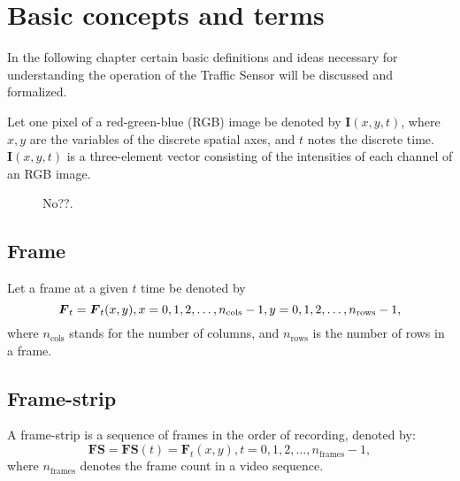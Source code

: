 \chapter{Basic concepts and terms}\label{chap:Concepts}
In the following chapter certain basic definitions and ideas necessary for understanding the operation of the Traffic Sensor will be discussed and formalized.

Let one pixel of a red-green-blue (RGB) image be denoted by $\boldsymbol{I}(x,y,t)$, where $x, y$ are the variables of the discrete spatial axes, and $t$ notes the discrete time.
$\boldsymbol{I}(x,y,t)$ is a three-element vector consisting of the intensities of each channel of an RGB image.

\begin{figure}[h!]
	\centering
	\scalebox{.7}{}
	\label{fig:notations}
	\caption{No??.}
\end{figure}

\section{Frame}
Let a frame at a given $t$ time be denoted by
\begin{displaymath}
	\boldsymbol{F}_t=\boldsymbol{F}_t(x,y),\\
	x=0,1,2,\dotsc,n_{\text{cols}}-1,\\
	y=0,1,2,\dotsc,n_{\text{rows}}-1,
\end{displaymath}
where $n_{\text{cols}}$ stands for the number of columns, and $n_{\text{rows}}$ is the number of rows in a frame. 

\section{Frame-strip}
A frame-strip is a sequence of frames in the order of recording, denoted by:
\begin{displaymath}
	\boldsymbol{FS}=\boldsymbol{FS}(t)=\boldsymbol{F}_t(x,y),
	t=0,1,2,\dotsc,n_{\text{frames}}-1,
\end{displaymath}
where $n_{\text{frames}}$ denotes the frame count in a video sequence.

